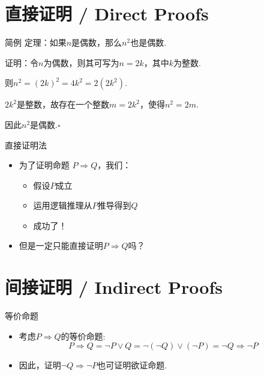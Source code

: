\documentclass[]{beamer}
\begin{document}
    

\section{直接证明 / Direct Proofs}

\begin{frame}{简例}
    定理：如果$n$是偶数，那么$n^2$也是偶数.
    
    证明：令$n$为偶数，则其可写为$n=2k$，其中$k$为整数.

    \hspace{3em} 则$n^2=(2k)^2=4k^2=2(2k^2)$.

    \hspace{3em} $2k^2$是整数，故存在一个整数$m=2k^2$，使得$n^2=2m$.

    \hspace{3em} 因此$n^2$是偶数.$\square$
\end{frame}

\begin{frame}{直接证明法}
    \begin{itemize}
        \item 为了证明命题 $P\Rightarrow Q$，我们：
        \begin{itemize}
            \item 假设$P$成立
            \item 运用逻辑推理从$P$推导得到$Q$
            \item 成功了！
        \end{itemize}
        \item 但是一定只能直接证明$P\Rightarrow Q$吗？
    \end{itemize}
\end{frame}

\section{间接证明 / Indirect Proofs}

\begin{frame}{等价命题}
    \begin{itemize}
        \item 考虑$P\Rightarrow Q$的等价命题:\[
        P \Rightarrow Q = \neg P \vee Q = \neg(\neg Q) \vee (\neg P) = \neg Q \Rightarrow \neg P
    \]
    \end{itemize}
    \begin{itemize}
        \item 因此，证明$\neg Q \Rightarrow \neg P$也可证明欲证命题.
    \end{itemize}
\end{frame}
\end{document}
